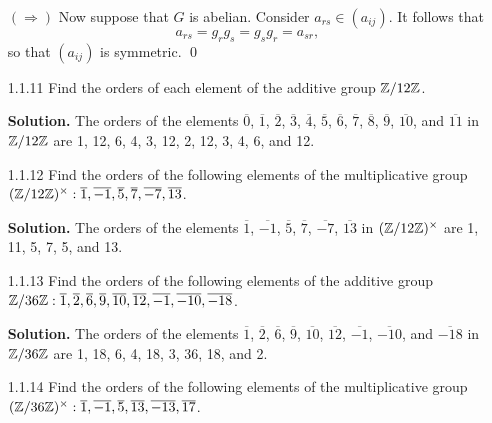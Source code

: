 \begin{enumerate}
      $(\Rightarrow)$ Now suppose that $G$ is abelian. Consider
      $a_{rs} \in (a_{ij})$. It follows that
      $$a_{rs} = g_rg_s = g_sg_r = a_{sr},$$
      so that $(a_{ij})$ is symmetric. \qed      
   \item[1.1.11]  Find the orders of each element of the additive group
                  $\mathbb{Z}/12\mathbb{Z}$.
                  
      \textbf{Solution.} The orders of the elements $\overline{0}$,
      $\overline{1}$, $\overline{2}$, $\overline{3}$, $\overline{4}$,
      $\overline{5}$, $\overline{6}$, $\overline{7}$, $\overline{8}$,
      $\overline{9}$, $\overline{10}$, and $\overline{11}$ in $\mathbb{Z}/12\mathbb{Z}$ are
      1, 12, 6, 4, 3, 12, 2, 12, 3, 4, 6, and 12.
   \item[1.1.12]  Find the orders of the following elements of the
                  multiplicative group $(\mathbb{Z}/12\mathbb{Z})^\times: \overline{1},
                  \overline{-1}, \overline{5}, \overline{7}, \overline{-7}, 
                  \overline{13}$.
                  
      \textbf{Solution.} The orders of the elements $\overline{1}$,
      $\overline{-1}$, $\overline{5}$, $\overline{7}$, $\overline{-7}$,
      $\overline{13}$ in $(\mathbb{Z}/12\mathbb{Z})^\times$ are 1, 11, 5, 7, 5, and 13.
   \item[1.1.13]  Find the orders of the following elements of the additive
                  group $\mathbb{Z}/36\mathbb{Z}: \overline{1}, \overline{2}, \overline{6}, 
                  \overline{9}, \overline{10}, \overline{12}, \overline{-1}, 
                  \overline{-10}, \overline{-18}$.
                  
      \textbf{Solution.} The orders of the elements $\overline{1}$,
      $\overline{2}$, $\overline{6}$, $\overline{9}$, $\overline{10}$,
      $\overline{12}$, $\overline{-1}$, $\overline{-10}$, and $\overline{-18}$
      in $\mathbb{Z}/36\mathbb{Z}$ are 1, 18, 6, 4, 18, 3, 36, 18, and 2.
   \item[1.1.14]  Find the orders of the following elements of the
                  multiplicative group $(\mathbb{Z}/36\mathbb{Z})^\times: \overline{1},
                  \overline{-1}, \overline{5}, \overline{13}, \overline{-13},
                  \overline{17}$.
                  

\end{enumerate}
